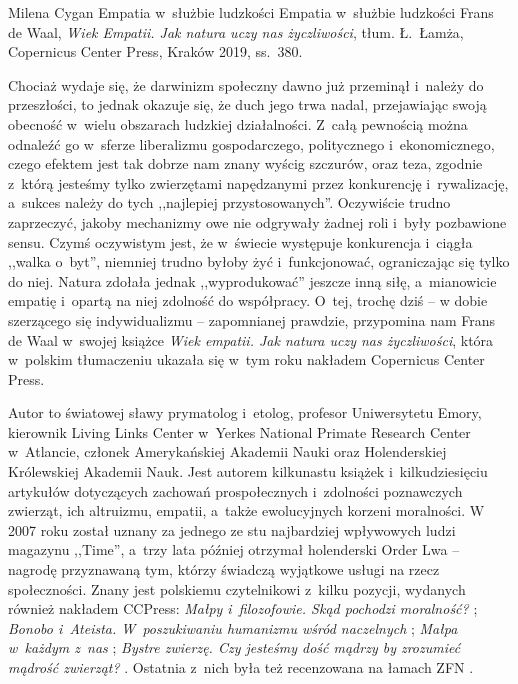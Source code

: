 \begin{recplenv}{Milena Cygan}
	{Empatia w~służbie ludzkości}
	{Empatia w~służbie ludzkości}
	{Frans de Waal, \textit{Wiek Empatii. Jak natura uczy nas życzliwości}, tłum. Ł.~Łamża, Copernicus Center
		Press, Kraków 2019, ss.~380.}




Chociaż wydaje się, że darwinizm społeczny dawno już przeminął i~należy do przeszłości, to jednak okazuje się, że duch
jego trwa nadal, przejawiając swoją obecność w~wielu obszarach ludzkiej działalności. Z~całą pewnością można odnaleźć
go w~sferze liberalizmu gospodarczego, politycznego i~ekonomicznego, czego efektem jest tak dobrze nam znany wyścig
szczurów, oraz teza, zgodnie z~którą jesteśmy tylko zwierzętami napędzanymi przez konkurencję i~rywalizację, a~sukces
należy do tych ,,najlepiej przystosowanych''. Oczywiście trudno zaprzeczyć, jakoby mechanizmy owe nie odgrywały żadnej
roli i~były pozbawione sensu. Czymś oczywistym jest, że w~świecie występuje konkurencja i~ciągła ,,walka o~byt'',
niemniej trudno byłoby żyć i~funkcjonować, ograniczając się tylko do niej. Natura zdołała jednak ,,wyprodukować'' jeszcze
inną siłę, a~mianowicie empatię i~opartą na niej zdolność do współpracy. O~tej, trochę dziś -- w dobie szerzącego się
indywidualizmu -- zapomnianej prawdzie, przypomina nam Frans de Waal w~swojej książce \textit{Wiek empatii. Jak natura
uczy nas życzliwości}, która w~polskim tłumaczeniu ukazała się w~tym roku nakładem Copernicus Center Press.

Autor to światowej sławy prymatolog i~etolog, profesor Uniwersytetu Emory, kierownik Living Links Center w~Yerkes
National Primate Research Center w~Atlancie, członek Amerykańskiej Akademii Nauki oraz Holenderskiej Królewskiej
Akademii Nauk. Jest autorem kilkunastu książek i~kilkudziesięciu artykułów dotyczących zachowań
prospołecznych i~zdolności poznawczych zwierząt, ich altruizmu, empatii, a~także ewolucyjnych korzeni moralności.
W 2007 roku został
uznany za jednego ze stu najbardziej wpływowych ludzi magazynu ,,Time'', a~trzy lata później otrzymał holenderski Order
Lwa -- nagrodę przyznawaną tym, którzy świadczą wyjątkowe usługi na rzecz społeczności. Znany jest polskiemu
czytelnikowi z~kilku pozycji, wydanych również nakładem CCPress: \textit{Małpy i~filozofowie. Skąd pochodzi moralność?}
\parencite*{waal_malpy_2013};
\textit{Bonobo i~Ateista. W~poszukiwaniu humanizmu wśród naczelnych}
\parencite*{waal_bonobo_2014};
\textit{Małpa w~każdym z~nas}
\parencite*{waal_malpa_2015};
\textit{Bystre zwierzę. Czy jesteśmy dość mądrzy by zrozumieć mądrość zwierząt?}
\parencite*{waal_bystre_2016}.
Ostatnia z~nich była też recenzowana na łamach ZFN
\parencite{sarosiek_odmiennosc_2018}.


\end{recplenv}
